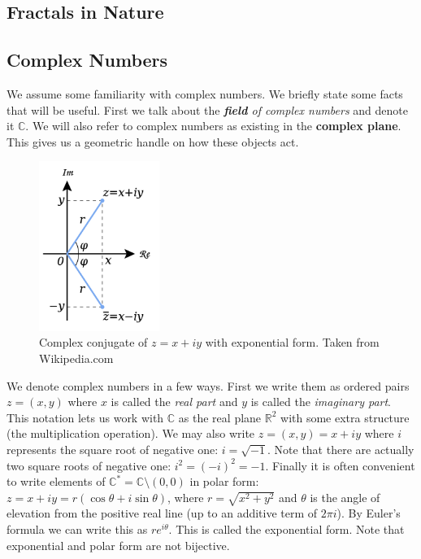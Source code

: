 \documentclass[11pt,oneside,final]{article}
\begin{document}
\subsection{Fractals in Nature}


\subsection{Complex Numbers} We assume some familiarity with complex numbers. We 
briefly state some facts that will be useful. First we talk about the 
\emph{\textbf{field} of complex numbers} and denote it \(\mathbb C\). We will 
also refer to complex numbers as existing in the \textbf{complex plane}. This
gives us a geometric handle on how these objects act.\\



\begin{figure}
	\centering
	\includegraphics[width=0.35\textwidth]{complex_conj}
	\caption{Complex conjugate of \(z = x + iy\) with exponential form. Taken
	from Wikipedia.com}
\end{figure}
We denote complex numbers in a few ways. First we write them as ordered pairs
\(z = (x, y)\) where \(x\) is called the \emph{real part} and \(y\) is called 
the \emph{imaginary part}. This notation lets us work with \(\mathbb C\) as the
real plane \(\mathbb R^2\) with some extra structure (the multiplication
operation). We may also write \(z = (x,y) = x + iy\) where \(i\) represents
the square root of negative one: \(i = \sqrt{-1}\). Note that there are 
actually two square roots of negative one: \(i^2 = (-i)^2 = -1\). Finally it is
often convenient to write elements of \(\mathbb C^* = \mathbb C \setminus 
(0,0)\) in polar form: \(z = x + iy = r(\cos \theta + i\sin \theta)\), where
\(r = \sqrt{x^2 + y^2}\) and \(\theta\) is the angle of elevation from the 
positive real line (up to an additive term of \(2\pi i\)). By Euler's formula
we can write this as \(re^{i\theta}\). This is called the exponential form. Note
that exponential and polar form are not bijective.\\
\end{document}
